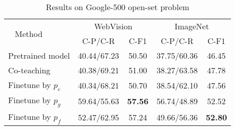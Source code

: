 \documentclass[sigconf]{acmart}
\begin{document}
\setlength{\tabcolsep}{4pt}
\begin{table}
	\centering
	\caption{Results on Google-500 open-set problem}
	\label{tab:openset}
\begin{tabular}{lcccc}
		\toprule
		\multirow{2}{*}{~ Method}  & \multicolumn{2}{c}{WebVision} & \multicolumn{2}{c}{ImageNet} \\
		\multicolumn{1}{c}{} & \multicolumn{1}{c}{C-P/C-R} & \multicolumn{1}{c}{C-F1}  & \multicolumn{1}{c}{C-P/C-R} & \multicolumn{1}{c}{C-F1}  \\
		\midrule
		Pretrained model    &40.44/67.23	& 50.50 & 37.75/60.36 & 46.45\\
		Co-teaching         &40.38/69.21    & 51.00 & 38.27/63.58 & 47.78\\
		Finetune by $p_c$   &40.34/68.21    & 50.70 & 38.54/62.10 & 47.56\\
		Finetune by $p_g$   &59.64/55.63	& \textbf{57.56} & 56.74/48.89  &52.52\\
		Finetune by $p_f$   &52.47/62.95	&57.24 &49.66/56.36	& \textbf{52.80}\\
		\bottomrule
	\end{tabular}
\end{table}
\setlength{\tabcolsep}{1.4pt}
\end{document}
